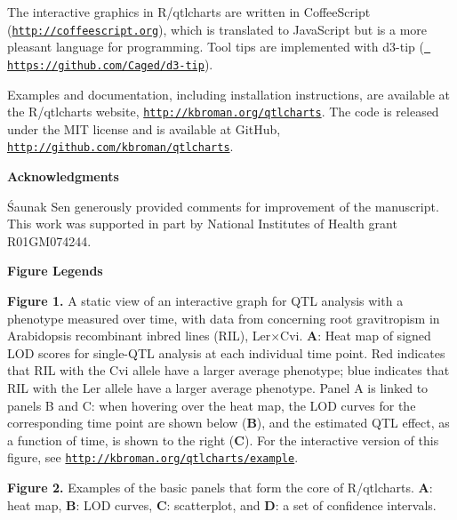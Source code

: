 \documentclass[12pt,letterpaper]{article}
\newenvironment{hanging}
{\begin{list}{}
        {\setlength{\labelwidth}{0in}
         \setlength{\leftmargin}{1em}
         \setlength{\itemindent}{-1em}
        }
}
{\end{list}}
\begin{document}
The interactive graphics in R/qtlcharts are written in CoffeeScript
(\href{http://coffeescript.org}{\tt \small http://coffeescript.org}),
which is translated to JavaScript but is a more pleasant language for
programming. Tool tips are implemented with d3-tip
(\href{https://github.com/Caged/d3-tip}{\tt \small
https://github.com/Caged/d3-tip}).

Examples and documentation, including installation instructions, are available at the R/qtlcharts website,
\href{http://kbroman.org/qtlcharts}{\tt \small http://kbroman.org/qtlcharts}.
The code is released under the MIT license and is
available at GitHub,
\href{https://github.com/kbroman/qtlcharts}{\tt \small http://github.com/kbroman/qtlcharts}.


\clearpage
\centerline{\sffamily \textbf{Acknowledgments}}
\'Saunak Sen generously provided comments for improvement of the
manuscript.
This work was supported in part by National Institutes of Health grant
R01GM074244.




\clearpage

\renewcommand*{\refname}{\centerline{\sffamily \normalsize \textbf{Literature Cited}}}




\newpage



\centerline{\sffamily \textbf{Figure Legends}}

\begin{hanging}

\item \textbf{Figure 1.}
A static view of an interactive graph for QTL analysis
with a phenotype measured over time, with data from \citet{Moore2013}
concerning root gravitropism in Arabidopsis recombinant inbred lines
(RIL), Ler$\times$Cvi.  \textbf{A}: Heat map of signed LOD
scores for single-QTL analysis at each individual time point. Red
indicates that RIL with the Cvi allele have a larger average
phenotype; blue indicates that RIL with the Ler allele have a larger
average phenotype. Panel A is linked to panels B and C: when hovering
over the heat map, the LOD curves for the corresponding time point are
shown below (\textbf{B}), and the estimated QTL effect, as a function
of time, is shown to the right (\textbf{C}).  For the interactive
version of this figure, see
\href{http://kbroman.org/qtlcharts/example}{\tt \small http://kbroman.org/qtlcharts/example}.

\item \textbf{Figure 2.}
Examples of the basic panels that form the core of
R/qtlcharts. \textbf{A}: heat map, \textbf{B}: LOD curves, \textbf{C}:
scatterplot, and \textbf{D}: a set of confidence intervals.

\end{hanging}
\end{document}
